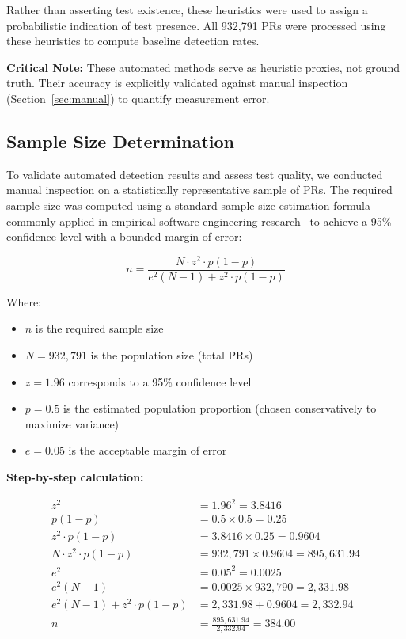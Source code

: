 \documentclass[conference]{IEEEtran}
\begin{document}
Rather than asserting test existence, these heuristics were used to assign a probabilistic indication of test presence. All 932,791 PRs were processed using these heuristics to compute baseline detection rates.

\textbf{Critical Note:} These automated methods serve as heuristic proxies, not ground truth. Their accuracy is explicitly validated against manual inspection (Section~\ref{sec:manual}) to quantify measurement error.

\subsection{Sample Size Determination}
\label{sec:sample}

To validate automated detection results and assess test quality, we conducted manual inspection on a statistically representative sample of PRs. The required sample size was computed using a standard sample size estimation formula commonly applied in empirical software engineering research~\cite{naghashzadeh2022developer} to achieve a 95\% confidence level with a bounded margin of error:

\begin{equation}
n = \frac{N \cdot z^{2} \cdot p(1-p)}{e^{2}(N-1) + z^{2} \cdot p(1-p)}
\end{equation}

Where:
\begin{itemize}
    \item $n$ is the required sample size
    \item $N = 932{,}791$ is the population size (total PRs)
    \item $z = 1.96$ corresponds to a 95\% confidence level
    \item $p = 0.5$ is the estimated population proportion (chosen conservatively to maximize variance)
    \item $e = 0.05$ is the acceptable margin of error
\end{itemize}

\textbf{Step-by-step calculation:}

\begin{align*}
z^{2} &= 1.96^{2} = 3.8416 \\
p(1-p) &= 0.5 \times 0.5 = 0.25 \\
z^{2} \cdot p(1-p) &= 3.8416 \times 0.25 = 0.9604 \\
N \cdot z^{2} \cdot p(1-p) &= 932{,}791 \times 0.9604 = 895{,}631.94 \\
e^{2} &= 0.05^{2} = 0.0025 \\
e^{2}(N-1) &= 0.0025 \times 932{,}790 = 2{,}331.98 \\
e^{2}(N-1) + z^{2} \cdot p(1-p) &= 2{,}331.98 + 0.9604 = 2{,}332.94 \\
n &= \frac{895{,}631.94}{2{,}332.94} = 384.00
\end{align*}
\end{document}
